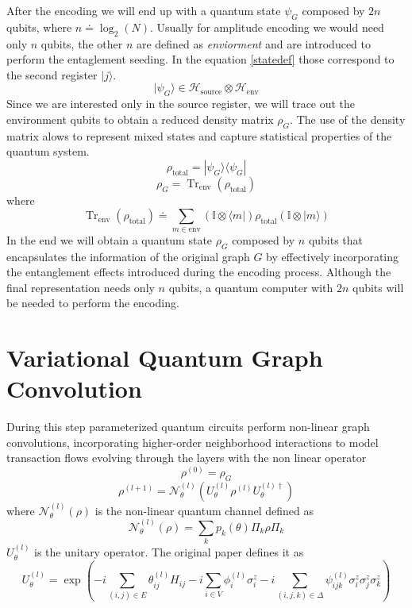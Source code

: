 After the encoding we will end up with a quantum state \(\psi_G\) composed by \(2n\) qubits, where \(n \doteq \log_2(N)\). Usually for amplitude encoding we would need only \(n\) qubits, the other \(n\) are defined as \textit{enviorment} and are introduced to perform the entaglement seeding. In the equation \ref{statedef} those correspond to the second register \(|j\rangle\).
\begin{equation}
    |\psi_G\rangle \in \mathcal{H}_\text{source} \otimes \mathcal{H}_\text{env}
\end{equation}
Since we are interested only in the source register, we will trace out the environment qubits to obtain a reduced density matrix \(\rho_G\). The use of the density matrix alows to represent mixed states and capture statistical properties of the quantum system.
\begin{equation}
    \rho_\text{total} = |\psi_G\rangle\langle\psi_G|
\end{equation}
\begin{equation}
    \rho_G = \operatorname{Tr}_{\text{env}}(\rho_\text{total})
\end{equation}
where
\begin{equation}
    \operatorname{Tr}_{\text{env}}(\rho_\text{total}) \doteq \sum_{m \in \text{env}} (\mathbb{I} \otimes \langle m|) \rho_{\text{total}} (\mathbb{I} \otimes |m\rangle)
\end{equation}
In the end we will obtain a quantum state \(\rho_G\) composed by \(n\) qubits that encapsulates the information of the original graph \(G\) by effectively incorporating the entanglement effects introduced during the encoding process. Although the final representation needs only \(n\) qubits, a quantum computer with \(2n\) qubits will be needed to perform the encoding.

\section{Variational Quantum Graph Convolution}
During this step parameterized quantum circuits perform non-linear graph convolutions, incorporating higher-order neighborhood interactions to model transaction flows evolving through the layers with the non linear operator
\begin{equation}
    \rho^{(0)}=\rho_{G}
\end{equation}
\begin{equation}
    \rho^{(l+1)}=\mathcal{N}_{\theta}^{(l)}(U_{\theta}^{(l)}\rho^{(l)}U_{\theta}^{(l)\dagger})
\end{equation}
where \(\mathcal{N}_\theta^{(l)}(\rho)\) is the non-linear quantum channel defined as
\begin{equation}
    \mathcal{N}_{\theta}^{(l)}(\rho)=\sum_{k}p_{k}(\theta)\Pi_{k}\rho\Pi_{k}
\end{equation}
\(U_{\theta}^{(l)}\) is the unitary operator. The original paper defines it as
\begin{equation}
    U_{\theta}^{(l)}=\operatorname{exp}\left(-i\sum_{(i,j)\in E}\theta_{ij}^{(l)}H_{ij}-i\sum_{i\in V}\phi_{i}^{(l)}\sigma_{i}^{z}-i\sum_{(i,j,k)\in\Delta}\psi_{ijk}^{(l)}\sigma_{i}^{z}\sigma_{j}^{z}\sigma_{k}^{z}\right)
\end{equation}


